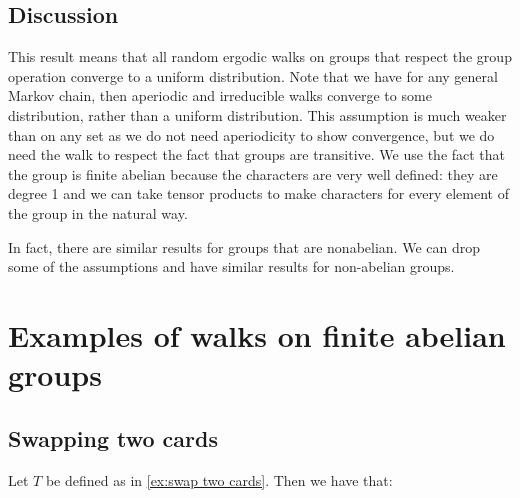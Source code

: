 \documentclass[]{article}
\theoremstyle{definition}
\numberwithin{theorem}{section}
\numberwithin{equation}{section}
\begin{document}
\subsection{Discussion}
This result means that all random ergodic walks on groups that respect the group operation converge to a uniform distribution. Note that we have for any general Markov chain, then aperiodic and irreducible walks converge to some distribution, rather than a uniform distribution. This assumption is much weaker than on any set as we do not need aperiodicity to show convergence, but we do need the walk to respect the fact that groups are transitive. We use the fact that the group is finite abelian because the characters are very well defined: they are degree 1 and we can take tensor products to make characters for every element of the group in the natural way. 

In fact, there are similar results for groups that are nonabelian. We can drop some of the assumptions and have similar results for non-abelian groups.

\section{Examples of walks on finite abelian groups}

\subsection{Swapping two cards}
Let $T$ be defined as in \cref{ex:swap two cards}. Then we have that:
\end{document}
